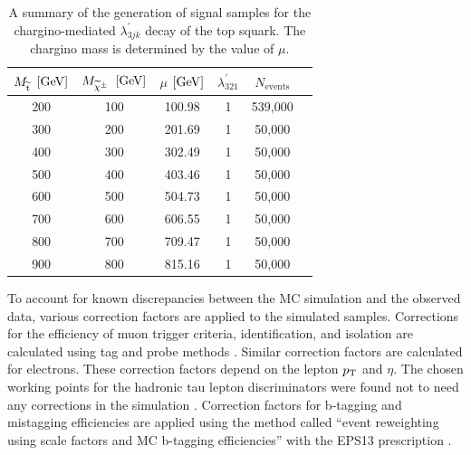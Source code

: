\begin{table}[htb]
  \begin{center}
    \begin{tabular}{|c|c|c|c|c|c|}
\hline
$M_{\widetilde{\mathrm{t}}}$ $[\text{Ge\hspace{-.08em}V}]$    &    $M_{\widetilde{\chi}^{\pm}}$ $[\text{Ge\hspace{-.08em}V}]$    &   $\mu$ $[\text{Ge\hspace{-.08em}V}]$  & $\lambda_{321}^{\prime}$ & $N_{\text{events}}$ \\
\hline \hline
200   &      100   &  100.98 & 1  &   539,000   \\
300   &      200   &  201.69 & 1  &   50,000   \\
400   &      300   &  302.49 & 1  &   50,000   \\
500   &      400   &  403.46 & 1  &   50,000   \\
600   &      500   &  504.73 & 1  &   50,000   \\
700   &      600   &  606.55 & 1  &   50,000   \\
800   &      700   &  709.47 & 1  &   50,000   \\
900   &      800   &  815.16 & 1  &   50,000   \\
\hline
\end{tabular}
\caption{A summary of the generation of signal samples for the chargino-mediated $\lambda_{3jk}^{\prime}$ decay of the top squark. The chargino mass is determined by the value of $\mu$.}
\label{tab:LQD321-samples}
\end{center}
\end{table}

To account for known discrepancies between the MC simulation and the observed data, various correction factors are applied to the simulated samples. Corrections for the efficiency of muon trigger criteria, identification, and isolation are calculated using tag and probe methods \cite{MuonRefEffs}. Similar correction factors are calculated for electrons. These correction factors depend on the lepton $p_{\mathrm{T}}$ and $\eta$. The chosen working points for the hadronic tau lepton discriminators were found not to need any corrections in the simulation \cite{TauID}. Correction factors for b-tagging and mistagging efficiencies are applied using the method called ``event reweighting using scale factors and MC b-tagging efficiencies'' with the EPS13 prescription \cite{BTagSFMethods}.